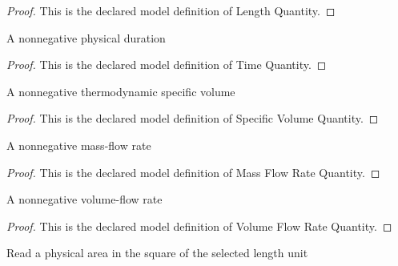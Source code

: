 \begin{proof}
  This is the declared model definition of Length Quantity.
\end{proof}
\begin{definition}
  \label{def:physics:phyx-mini-0445:phyxminiproblems-problemphyxmini0445-timequantity}
  A nonnegative physical duration
\end{definition}
\begin{proof}
  This is the declared model definition of Time Quantity.
\end{proof}
\begin{definition}
  \label{def:physics:phyx-mini-0445:phyxminiproblems-problemphyxmini0445-specificvolumequantity}
  A nonnegative thermodynamic specific volume
\end{definition}
\begin{proof}
  This is the declared model definition of Specific Volume Quantity.
\end{proof}
\begin{definition}
  \label{def:physics:phyx-mini-0445:phyxminiproblems-problemphyxmini0445-massflowratequantity}
  A nonnegative mass-flow rate
\end{definition}
\begin{proof}
  This is the declared model definition of Mass Flow Rate Quantity.
\end{proof}
\begin{definition}
  \label{def:physics:phyx-mini-0445:phyxminiproblems-problemphyxmini0445-volumeflowratequantity}
  A nonnegative volume-flow rate
\end{definition}
\begin{proof}
  This is the declared model definition of Volume Flow Rate Quantity.
\end{proof}
\begin{definition}
  \label{def:physics:phyx-mini-0445:phyxminiproblems-problemphyxmini0445-areareadout}
  Read a physical area in the square of the selected length unit
\end{definition}
